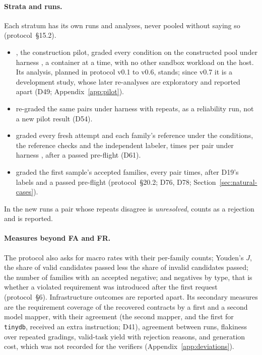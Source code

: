 \paragraph{Strata and runs.} Each stratum has its own runs and analyses, never pooled without saying so
(protocol~\S15.2).
\begin{itemize}
\item \texttt{\PILOTRUN}, the construction pilot, graded every condition on the constructed pool under harness
  , a container at a time, with no other sandbox workload on the host. Its analysis,
  planned in protocol v0.1 to v0.6, stands; since v0.7 it is a development study, whose later re-analyses are
  exploratory and reported apart (D49; Appendix~\ref{app:pilot}).
\item \texttt{\REGRADERUN} re-graded the same pairs under harness  with  repeats, as a
  reliability run, not a new pilot result (D54).
\item \texttt{\FRESHRUN} graded every fresh attempt and each family's reference under the 
  conditions, the reference checks and the independent labeler,  times per pair under harness
  , after a passed pre-flight (D61).
\item \texttt{\NATURALRUN} graded the first sample's accepted families, every pair  times, after D19's
  labels and a passed pre-flight (protocol~\S20.2; D76, D78; Section~\ref{sec:natural-cases}).
\end{itemize}
In the new runs a pair whose repeats disagree is \emph{unresolved}, counts as a rejection and is reported.

\paragraph{Measures beyond FA and FR.} The protocol also asks for macro rates with their per-family counts; Youden's
$J$, the share of valid candidates passed less the share of invalid candidates passed; the number of families with an
accepted negative; and negatives by type, that is whether a violated requirement was introduced after the first
request (protocol~\S6). Infrastructure outcomes are reported apart. Its secondary measures are the requirement coverage
of the recovered contracts by a first and a second model mapper, with their agreement (the second mapper, and the
first for \texttt{tinydb}, received an extra instruction; D41), agreement between runs, flakiness over repeated gradings,
valid-task yield with rejection reasons, and generation cost, which was not recorded for the verifiers
(Appendix~\ref{app:deviations}).

